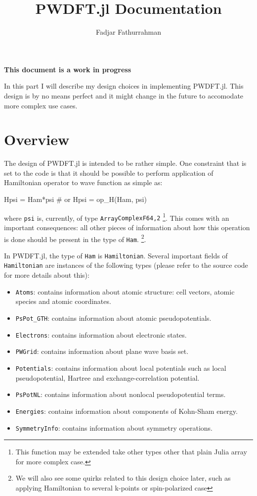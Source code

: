 \documentclass[a4paper,10pt]{article}
\newcommand{\jlinline}[1]{\texttt{#1}}
\begin{document}
\title{\textsf{PWDFT.jl} Documentation}
\author{Fadjar Fathurrahman}
\date{}
\maketitle


\textbf{This document is a work in progress}

In this part I will describe my design choices in implementing \textsf{PWDFT.jl}.
This design is by no means perfect
and it might change in the future to accomodate more complex use cases.

\section{Overview}

The design of \textsf{PWDFT.jl} is intended to be rather simple. One constraint
that is set to the code is that it should be possible to perform application
of Hamiltonian operator to wave function as simple as:
%
\begin{juliacode}
Hpsi = Ham*psi # or
Hpsi = op_H(Ham, psi)
\end{juliacode}
%
where \jlinline{psi} is, currently, of type \jlinline{Array{ComplexF64,2}}
\footnote{This function may be extended take other types other that plain Julia
array for more complex case.}.
%
This comes with an important consequences: all other pieces of information
about how this operation is done should be present in the type of \jlinline{Ham}.
\footnote{We will also see some quirks related to this design choice later,
such as applying Hamiltonian to several k-points or spin-polarized case}.

In \textsf{PWDFT.jl}, the type of \jlinline{Ham} is \jlinline{Hamiltonian}.
Several important fields of \jlinline{Hamiltonian} are instances of the following
types (please refer to the source code for more details about this):
\begin{itemize}
\item \jlinline{Atoms}: contains information about atomic structure: cell
vectors, atomic species and atomic coordinates.
\item \jlinline{PsPot_GTH}: contains information about atomic pseudopotentials.
\item \jlinline{Electrons}: contains information about electronic states.
\item \jlinline{PWGrid}: contains information about plane wave basis set.
\item \jlinline{Potentials}: contains information about local potentials such
as local pseudopotential, Hartree and exchange-correlation potential.
\item \jlinline{PsPotNL}: contains information about nonlocal pseudopotential
terms.
\item \jlinline{Energies}: contains information about components of Kohn-Sham
energy.
\item \jlinline{SymmetryInfo}: contains information about symmetry operations.
\end{itemize}
\end{document}
